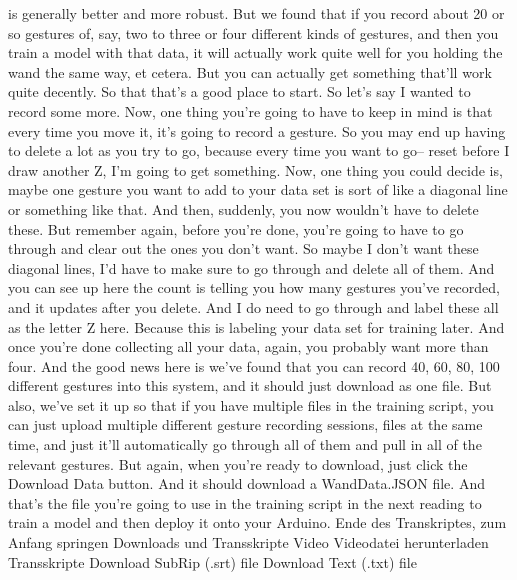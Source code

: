     is generally better and more robust.
    But we found that if you record about 20 or so gestures of, say, two
    to three or four different kinds of gestures,
    and then you train a model with that data,
    it will actually work quite well for you holding the wand the same way, et
    cetera.
    But you can actually get something that'll work quite decently.
    So that that's a good place to start.
    So let's say I wanted to record some more.
    Now, one thing you're going to have to keep in mind
    is that every time you move it, it's going to record a gesture.
    So you may end up having to delete a lot as you try to go,
    because every time you want to go--
    reset before I draw another Z, I'm going to get something.
    Now, one thing you could decide is, maybe one gesture
    you want to add to your data set is sort of like a diagonal line
    or something like that.
    And then, suddenly, you now wouldn't have to delete these.
    But remember again, before you're done, you're
    going to have to go through and clear out the ones you don't want.
    So maybe I don't want these diagonal lines,
    I'd have to make sure to go through and delete all of them.
    And you can see up here the count is telling you
    how many gestures you've recorded, and it updates after you delete.
    And I do need to go through and label these all as the letter Z here.
    Because this is labeling your data set for training later.
    And once you're done collecting all your data,
    again, you probably want more than four.
    And the good news here is we've found that you can record 40, 60, 80,
    100 different gestures into this system, and it should just
    download as one file.
    But also, we've set it up so that if you have multiple files in the training
    script, you can just upload multiple different gesture recording
    sessions, files at the same time, and just it'll
    automatically go through all of them and pull in all of the relevant gestures.
    But again, when you're ready to download,
    just click the Download Data button.
    And it should download a WandData.JSON file.
    And that's the file you're going to use in the training
    script in the next reading to train a model
    and then deploy it onto your Arduino.
    Ende des Transkriptes, zum Anfang springen
    Downloads und Transskripte
    Video
    Videodatei herunterladen
    Transskripte
    Download SubRip (.srt) file
    Download Text (.txt) file
    
